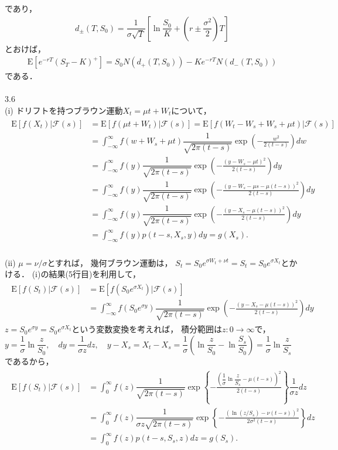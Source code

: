 \documentclass[a4paper,11pt]{jsarticle}
\newcommand{\df}[2]{\dfrac{#1}{#2}}
\newcommand{\intinf}{\int_{-\infty}^{\infty}}
\newcommand{\intzero}{\int_{0}^{\infty}}
\newcommand{\E}{\mathrm{E}}
\newcommand{\F}{\mathcal{F}}
\begin{document}
であり，
\begin{align*}
  d_{\pm}(T,S_0)=\df{1}{\sigma\sqrt{T}} \left[\ln{\df{S_0}{K}}
  +\left(r\pm\df{\sigma^2}{2}\right) T \right]
\end{align*}
とおけば，
\begin{align*}
  \E[e^{-rT}(S_T-K)^+]=S_0 N(d_+(T,S_0))
  -K e^{-rT} N(d_-(T,S_0))
\end{align*}
である．
\\ \\
3.6 \\
(i)
ドリフトを持つブラウン運動$X_t=\mu t+W_t$について，
\begin{align*}
  \begin{split}
    \E[f(X_t)|\F(s)]&=\E[f(\mu t+W_t)|\F(s)]
    =\E[f(W_t-W_s+W_s+\mu t)|\F(s)] \\
    &=\intinf f(w+W_s+\mu t)\df{1}{\sqrt{2\pi(t-s)}}
    \exp\left(-\frac{w^2}{2(t-s)}\right)dw \\
    &=\intinf f(y)\df{1}{\sqrt{2\pi(t-s)}}
    \exp\left(-\frac{(y-W_s-\mu t)^2}{2(t-s)}\right)dy\\
    &=\intinf f(y)\df{1}{\sqrt{2\pi(t-s)}}
    \exp\left(-\frac{(y-W_s-\mu s-\mu(t-s))^2}{2(t-s)}\right)dy\\
    &=\intinf f(y)\df{1}{\sqrt{2\pi(t-s)}}
    \exp\left(-\frac{(y-X_s-\mu(t-s))^2}{2(t-s)}\right)dy\\
    &=\intinf f(y)p(t-s,X_s,y)dy=g(X_s).
  \end{split}
\end{align*}
\\
(ii)
$\mu=\nu/\sigma$とすれば，
幾何ブラウン運動は，
$S_t=S_0 e^{\sigma W_t+\nu t}=S_t=S_0 e^{\sigma X_t}$とかける．
(i)の結果(5行目)を利用して，
\begin{align*}
  \begin{split}
    \E[f(S_t)|\F(s)]&=\E[f(S_0 e^{\sigma X_t})|\F(s)] \\
    &=\intinf f(S_0 e^{\sigma y})\df{1}{\sqrt{2\pi(t-s)}}
    \exp\left(-\frac{(y-X_s-\mu(t-s))^2}{2(t-s)}\right)dy
  \end{split}
\end{align*}
$z=S_0 e^{\sigma y}=S_0 e^{\sigma X_t}$という変数変換を考えれば，
積分範囲は$z:0\to\infty$で，\\
$y=\df{1}{\sigma}\ln{\df{z}{S_0}}, \quad dy=\df{1}{\sigma z}dz, \quad
y-X_s=X_t-X_s=\df{1}{\sigma}(\ln{\df{z}{S_0}}-\ln{\df{S_s}{S_0}})
=\df{1}{\sigma}\ln{\df{z}{S_s}}$であるから，
\begin{align*}
  \begin{split}
    \E[f(S_t)|\F(s)]
    &=\intzero f(z)\df{1}{\sqrt{2\pi(t-s)}}
    \exp\left\{-\frac{\left( \df{1}{\sigma}\ln\df{z}{S_s}
    -\mu(t-s) \right)^2}{2(t-s)}\right\}\df{1}{\sigma z}dz \\
    &=\intzero f(z)\df{1}{\sigma z\sqrt{2\pi(t-s)}}
    \exp\left\{-\frac{\left(\ln(z/S_s)-\nu(t-s)\right)^2}
    {2\sigma^2(t-s)}\right\}dz \\
    &=\intzero f(z) p(t-s,S_s,z)dz=g(S_s).
  \end{split}
\end{align*}
\end{document}
